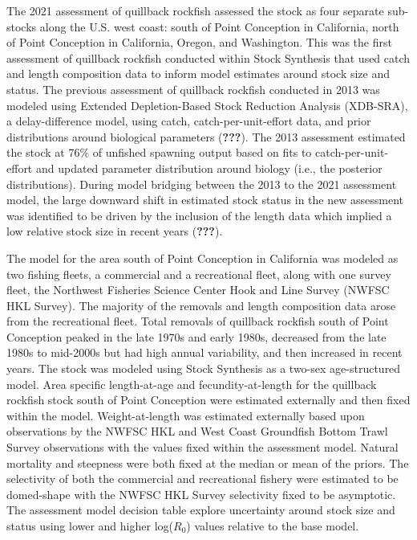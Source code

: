 \documentclass[11pt,
  english,
  a4paper,
]{article}
\begin{document}
The 2021 assessment of quillback rockfish assessed the stock as four separate sub-stocks along the U.S. west coast: south of Point Conception in California, north of Point Conception in California, Oregon, and Washington. This was the first assessment of quillback rockfish conducted within Stock Synthesis that used catch and length composition data to inform model estimates around stock size and status. The previous assessment of quillback rockfish conducted in 2013 was modeled using Extended Depletion-Based Stock Reduction Analysis (XDB-SRA), a delay-difference model, using catch, catch-per-unit-effort data, and prior distributions around biological parameters {({\textbf{???}})\leavevmode\tagmcend\tagstructend}. The 2013 assessment estimated the stock at 76\% of unfished spawning output based on fits to catch-per-unit-effort and updated parameter distribution around biology (i.e., the posterior distributions). During model bridging between the 2013 to the 2021 assessment model, the large downward shift in estimated stock status in the new assessment was identified to be driven by the inclusion of the length data which implied a low relative stock size in recent years {({\textbf{???}})\leavevmode\tagmcend\tagstructend}.

\leavevmode\tagmcend\tagstructend\par


The model for the area south of Point Conception in California was modeled as two fishing fleets, a commercial and a recreational fleet, along with one survey fleet, the Northwest Fisheries Science Center Hook and Line Survey (NWFSC HKL Survey). The majority of the removals and length composition data arose from the recreational fleet. Total removals of quillback rockfish south of Point Conception peaked in the late 1970s and early 1980s, decreased from the late 1980s to mid-2000s but had high annual variability, and then increased in recent years. The stock was modeled using Stock Synthesis as a two-sex age-structured model. Area specific length-at-age and fecundity-at-length for the quillback rockfish stock south of Point Conception were estimated externally and then fixed within the model. Weight-at-length was estimated externally based upon observations by the NWFSC HKL and West Coast Groundfish Bottom Trawl Survey observations with the values fixed within the assessment model. Natural mortality and steepness were both fixed at the median or mean of the priors. The selectivity of both the commercial and recreational fishery were estimated to be domed-shape with the NWFSC HKL Survey selectivity fixed to be asymptotic. The assessment model decision table explore uncertainty around stock size and status using lower and higher log({\(R_0\)\leavevmode\tagmcend\tagstructend}) values relative to the base model.
\end{document}
